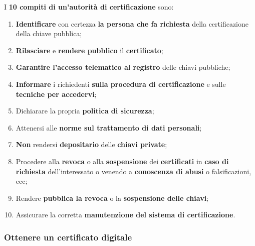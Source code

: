 \documentclass[a4paper]{article}
\begin{document}
	I \textbf{10 compiti di un'autorità di certificazione} sono:
	\begin{enumerate}
		\item \textbf{Identificare} con certezza \textbf{la persona che fa richiesta} della certificazione della chiave pubblica;
		
		\item \textbf{Rilasciare} e \textbf{rendere pubblico} il \textbf{certificato};
		
		\item \textbf{Garantire l'accesso telematico al registro} delle chiavi pubbliche;
		
		\item \textbf{Informare} i richiedenti \textbf{sulla procedura di certificazione} e sulle \textbf{tecniche per accedervi};
		
		\item Dichiarare la propria \textbf{politica di sicurezza};
		
		\item Attenersi alle \textbf{norme sul trattamento di dati personali};
		
		\item \textbf{Non} rendersi \textbf{depositario} delle \textbf{chiavi private};
		
		\item Procedere alla \textbf{revoca} o alla \textbf{sospensione} dei \textbf{certificati} in \textbf{caso di richiesta} dell'interessato o venendo a \textbf{conoscenza di abusi} o falsificazioni, ecc;
		
		\item Rendere \textbf{pubblica la revoca} o la \textbf{sospensione delle chiavi};
		
		\item Assicurare la corretta \textbf{manutenzione del sistema di certificazione}.
	\end{enumerate}\newpage
	
	\subsubsection{Ottenere un certificato digitale}
	
\end{document}
